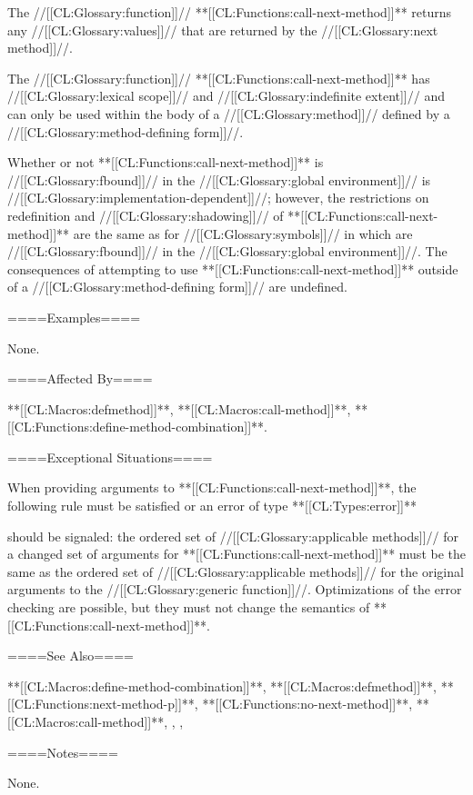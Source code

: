 The //[[CL:Glossary:function]]// **[[CL:Functions:call-next-method]]** returns any //[[CL:Glossary:values]]// that are returned by the //[[CL:Glossary:next method]]//.

The //[[CL:Glossary:function]]// **[[CL:Functions:call-next-method]]** has //[[CL:Glossary:lexical scope]]// and //[[CL:Glossary:indefinite extent]]// and can only be used within the body of a //[[CL:Glossary:method]]// defined by a //[[CL:Glossary:method-defining form]]//.


Whether or not **[[CL:Functions:call-next-method]]** is //[[CL:Glossary:fbound]]// in the //[[CL:Glossary:global environment]]// is //[[CL:Glossary:implementation-dependent]]//; however, the restrictions on redefinition and //[[CL:Glossary:shadowing]]// of **[[CL:Functions:call-next-method]]** are the same as for //[[CL:Glossary:symbols]]// in  which are //[[CL:Glossary:fbound]]// in the //[[CL:Glossary:global environment]]//. The consequences of attempting to use **[[CL:Functions:call-next-method]]** outside of a //[[CL:Glossary:method-defining form]]// are undefined.

====Examples====

None.

====Affected By====

**[[CL:Macros:defmethod]]**, **[[CL:Macros:call-method]]**, **[[CL:Functions:define-method-combination]]**.

====Exceptional Situations====





When providing arguments to **[[CL:Functions:call-next-method]]**, the following rule must be satisfied or an error of type **[[CL:Types:error]]**

should be signaled: the ordered set of //[[CL:Glossary:applicable methods]]// for a changed set of arguments for **[[CL:Functions:call-next-method]]** must be the same as the ordered set of //[[CL:Glossary:applicable methods]]// for the original arguments to the //[[CL:Glossary:generic function]]//. Optimizations of the error checking are possible, but they must not change the semantics of **[[CL:Functions:call-next-method]]**.

====See Also====

**[[CL:Macros:define-method-combination]]**, **[[CL:Macros:defmethod]]**, **[[CL:Functions:next-method-p]]**, **[[CL:Functions:no-next-method]]**, **[[CL:Macros:call-method]]**, {\secref\MethodSelectionAndCombination}, {\secref\StdMethComb}, {\secref\BuiltInMethCombTypes}

====Notes====

None.


 
